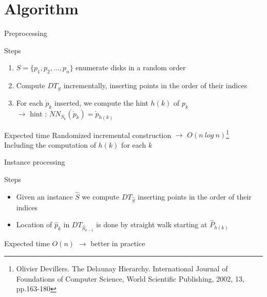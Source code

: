 \documentclass{beamer}
\begin{document}
\section{Algorithm}
\frame{\tableofcontents[currentsection]}
\begin{frame}{Preprocessing}

  \begin{block}{Steps}
    \begin{enumerate}
     \item $S = \{p_1,p_2,...,p_n\}$ enumerate disks in a random order
     \item Compute $DT_{\dot{S}}$ incrementally, inserting points in the order of their indices
     \item For each $\dot{p}_k$ inserted, we compute the hint $h(k)$ of $p_k$ \\
     $\rightarrow$ hint : $NN_{\dot{S_k}}(\dot{p}_k) = \dot{p}_{h(k)}$
    \end{enumerate}
  \end{block}

  \begin{block}{Expected time}
    Randomized incremental construction $\rightarrow$ $O(n~log~n)$\footnote{Olivier Devillers. The Delaunay Hierarchy. International Journal of Foundations of Computer Science, World Scientific Publishing, 2002, 13, pp.163-180} \\
    Including the computation of $h(k)$ for each $k$
  \end{block}
  
  
\end{frame}




\begin{frame}{Instance processing}
  \begin{block}{Steps}
    \begin{itemize}
     \item Given an instance $\hat{S}$ we compute $DT_{\hat{S}}$ inserting points in the order of their indices
     \item Location of $\hat{p}_k$ in $DT_{\hat{S}_{k-1}}$ is done by straight walk starting at $\hat{P}_{h(k)}$
    \end{itemize}
  \end{block}
  
  \begin{block}{Expected time}
    $O(n)$ $\rightarrow$ better in practice
  \end{block}
  
\end{frame}
\end{document}
